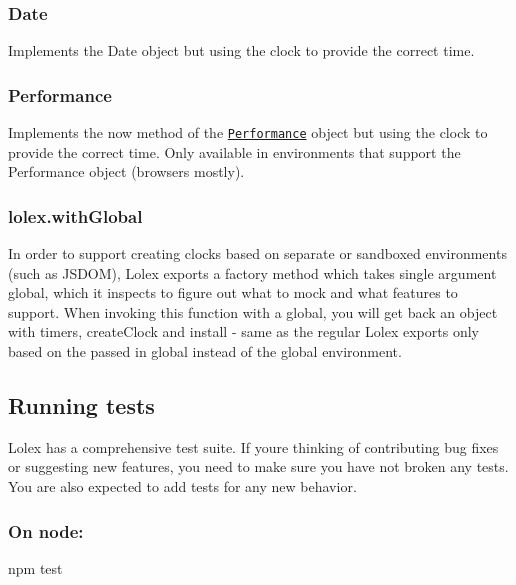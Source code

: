 \subsubsection*{{\ttfamily Date}}

Implements the {\ttfamily Date} object but using the clock to provide the correct time.

\subsubsection*{{\ttfamily Performance}}

Implements the {\ttfamily now} method of the \href{https://developer.mozilla.org/en-US/docs/Web/API/Performance/now}{\tt {\ttfamily Performance}} object but using the clock to provide the correct time. Only available in environments that support the Performance object (browsers mostly).

\subsubsection*{{\ttfamily lolex.\+with\+Global}}

In order to support creating clocks based on separate or sandboxed environments (such as J\+S\+D\+OM), Lolex exports a factory method which takes single argument {\ttfamily global}, which it inspects to figure out what to mock and what features to support. When invoking this function with a global, you will get back an object with {\ttfamily timers}, {\ttfamily create\+Clock} and {\ttfamily install} -\/ same as the regular Lolex exports only based on the passed in global instead of the global environment.

\subsection*{Running tests}

Lolex has a comprehensive test suite. If you\textquotesingle{}re thinking of contributing bug fixes or suggesting new features, you need to make sure you have not broken any tests. You are also expected to add tests for any new behavior.

\subsubsection*{On node\+:}


\begin{DoxyCode}
npm test
\end{DoxyCode}


